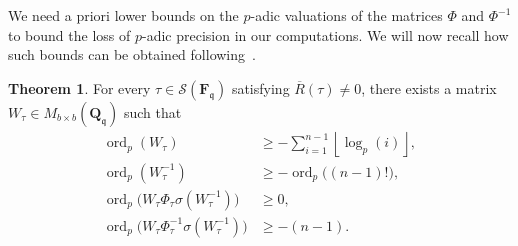 \documentclass[a4paper,11pt]{article}
\numberwithin{equation}{section}
\providecommand{\floor}[1]{\left\lfloor#1\right\rfloor}   %
\newcommand{\QQ}{\mathbf{Q}} %
\newcommand{\FF}{\mathbf{F}} %
\DeclareMathOperator{\ord}{ord}          %
\theoremstyle{definition}
\newtheorem{thm}{Theorem}[section]
\begin{document}
We need a priori lower bounds on the $p$-adic valuations of the matrices 
$\Phi$ and $\Phi^{-1}$ to bound the loss of $p$-adic precision in our 
computations. We will now recall how such bounds can be obtained 
following~\cite{AbbottKedlayaRoe2006}.

\begin{thm} \label{thm:deltabound}
For every 
$\tau \in \mathcal{S}(\FF_{\mathfrak{q}})$ satisfying $\overline{R}(\tau) \neq 0$, 
there exists a matrix $W_{\tau} \in M_{b \times b}(\QQ_{\mathfrak{q}})$ such that 
\begin{align*}
\ord_p(W_{\tau}) & \geq -\sum_{i=1}^{n-1} \floor{\log_p(i)}, \\
\ord_p(W_{\tau}^{-1}) & \geq -\ord_p\bigl((n-1)!\bigr), \\
\ord_p\bigl(W_{\tau} \Phi_{\tau} \sigma(W_{\tau}^{-1})\bigr) & \geq 0, \\
\ord_p\bigl(W_{\tau} \Phi_{\tau}^{-1} \sigma(W_{\tau}^{-1})\bigr) & \geq -(n-1).
\end{align*}
\end{thm}
\end{document}
